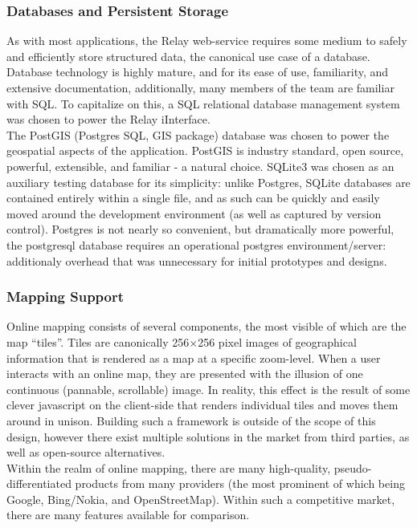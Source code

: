 \documentclass{article}
\begin{document}
\subsubsection{Databases and Persistent Storage}

As with most applications, the Relay web-service requires some medium to safely and efficiently store structured data, the canonical use case of a database.
Database technology is highly mature, and for its ease of use, familiarity, and extensive documentation, additionally, many members of the team are familiar with SQL.
To capitalize on this, a SQL relational database management system was chosen to power the Relay iInterface.\\

The PostGIS (Postgres SQL, GIS package) database was chosen to power the geospatial aspects of the application.
PostGIS is industry standard, open source, powerful, extensible, and familiar - a natural choice.
SQLite3 was chosen as an auxiliary testing database for its simplicity: unlike Postgres, SQLite databases are contained entirely within a single file, and as such can be quickly and easily moved around the development environment (as well as captured by version control).
Postgres is not nearly so convenient, but dramatically more powerful, the postgresql database requires an operational postgres environment/server: additionaly overhead that was unnecessary for initial prototypes and designs.\\

\subsubsection{Mapping Support}

Online mapping consists of several components, the most visible of which are the map ``tiles''.
Tiles are canonically 256$\times$256 pixel images of geographical information that is rendered as a map at a specific zoom-level.
When a user interacts with an online map, they are presented with the illusion of one continuous (pannable, scrollable) image.
In reality, this effect is the result of some clever javascript on the client-side that renders individual tiles and moves them around in unison.
Building such a framework is outside of the scope of this design, however there exist multiple solutions in the market from third parties, as well as open-source alternatives.\\

Within the realm of online mapping, there are many high-quality, pseudo-differentiated products from many providers (the most prominent of which being Google, Bing/Nokia, and OpenStreetMap).
Within such a competitive market, there are many features available for comparison.\\
\end{document}
